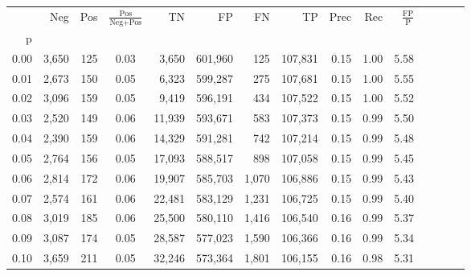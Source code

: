 \begin{tabular}{rrrcrrrrrrrrrrr}
\toprule
{} &     Neg &    Pos & $\frac{\text{Pos}}{\text{Neg}+\text{Pos}}$ &       TN &       FP &       FN &       TP &  Prec &   Rec & $\frac{\text{FP}}{\text{P}}$ \\
p    &         &        &                                            &          &          &          &          &       &       &                              \\
\midrule
0.00 &   3,650 &    125 &                                       0.03 &    3,650 &  601,960 &      125 &  107,831 &  0.15 &  1.00 &                         5.58 \\
0.01 &   2,673 &    150 &                                       0.05 &    6,323 &  599,287 &      275 &  107,681 &  0.15 &  1.00 &                         5.55 \\
0.02 &   3,096 &    159 &                                       0.05 &    9,419 &  596,191 &      434 &  107,522 &  0.15 &  1.00 &                         5.52 \\
0.03 &   2,520 &    149 &                                       0.06 &   11,939 &  593,671 &      583 &  107,373 &  0.15 &  0.99 &                         5.50 \\
0.04 &   2,390 &    159 &                                       0.06 &   14,329 &  591,281 &      742 &  107,214 &  0.15 &  0.99 &                         5.48 \\
0.05 &   2,764 &    156 &                                       0.05 &   17,093 &  588,517 &      898 &  107,058 &  0.15 &  0.99 &                         5.45 \\
0.06 &   2,814 &    172 &                                       0.06 &   19,907 &  585,703 &    1,070 &  106,886 &  0.15 &  0.99 &                         5.43 \\
0.07 &   2,574 &    161 &                                       0.06 &   22,481 &  583,129 &    1,231 &  106,725 &  0.15 &  0.99 &                         5.40 \\
0.08 &   3,019 &    185 &                                       0.06 &   25,500 &  580,110 &    1,416 &  106,540 &  0.16 &  0.99 &                         5.37 \\
0.09 &   3,087 &    174 &                                       0.05 &   28,587 &  577,023 &    1,590 &  106,366 &  0.16 &  0.99 &                         5.34 \\
0.10 &   3,659 &    211 &                                       0.05 &   32,246 &  573,364 &    1,801 &  106,155 &  0.16 &  0.98 &                         5.31 \\

\end{tabular}
